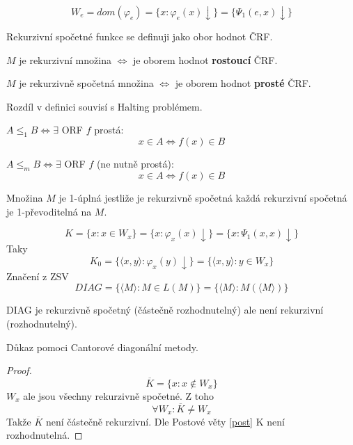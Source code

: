 \begin{definition}
	\[ W_e = dom(\varphi_e) = \{ x: \varphi_e(x) \downarrow \} = \{ \Psi_1(e, x) \downarrow \} \]
\end{definition}

\begin{note}
	Rekurzivní spočetné funkce se definuji jako obor hodnot ČRF.

	$M$ je rekurzivní množina $\iff$ je oborem hodnot \textbf{rostoucí} ČRF.

	$M$ je rekurzivně spočetná množina $\iff$ je oborem hodnot \textbf{prosté} ČRF.

	Rozdíl v definici souvisí s Halting problémem.
\end{note}

\begin{definition}[1,m převoditelnost]
	$A \leq_1 B \iff \exists$ ORF $f$ prostá:
	\[ x \in A \iff f(x) \in B \]

	$A \leq_m B \iff \exists$ ORF $f$ (ne nutně prostá):
	\[ x \in A \iff f(x) \in B \]
\end{definition}

\begin{definition}[1-úplnost]
	Množina $M$ je 1-úplná jestliže je rekurzivně spočetná každá rekurzivní spočetná je 1-převoditelná na $M$.
\end{definition}

\begin{definition}[K, DIAG]
	\[ K = \{ x: x \in W_x \} = \{ x: \varphi_x(x) \downarrow \} = \{ x: \Psi_1(x, x) \downarrow \} \]
	Taky
	\[ K_0 = \{ \langle x, y \rangle: \varphi_x(y) \downarrow \} = \{ \langle x, y \rangle: y \in W_x \} \]
	Značení z ZSV
	\[ DIAG = \{ \langle M \rangle: M \in L(M) \} = \{ \langle M \rangle: M(\langle M \rangle) \} \]
\end{definition}

\begin{lemma}[DIAG, K]
	DIAG je rekurzivně spočetný (částečně rozhodnutelný) ale není rekurzivní (rozhodnutelný).

	Důkaz pomoci Cantorové diagonální metody.
\end{lemma}
\begin{proof}
	\[ \overline{K} = \{ x: x \notin W_x \} \]
	$W_x$ ale jsou všechny rekurzivně spočetné.
	Z toho
	\[ \forall W_x: \overline{K} \neq W_x \]
	Takže $\overline{K}$ není částečně rekurzivní.
	Dle Postové věty \cref{post} K není rozhodnutelná.
\end{proof}

